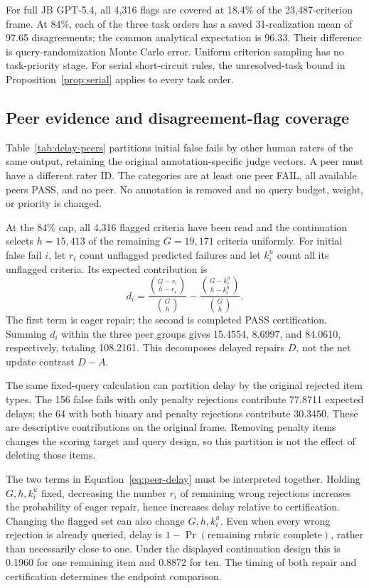 For full JB GPT-5.4, all 4,316 flags are covered at 18.4\% of the
23,487-criterion frame. At 84\%, each of the three task orders has a saved
31-realization mean of 97.65 disagreements; the common analytical expectation
is 96.33. Their difference is query-randomization Monte Carlo error.
Uniform criterion sampling has no task-priority stage. For serial
short-circuit rules, the unresolved-task bound in
Proposition~\ref{prop:serial} applies to every task order.

\subsection{Peer evidence and disagreement-flag coverage}
\label{app:flag-diagnostics}

Table~\ref{tab:delay-peers} partitions initial false fails by other human
raters of the same output, retaining the original annotation-specific
judge vectors. A peer must have a different rater ID. The categories are
at least one peer FAIL, all available peers PASS, and no peer. No annotation
is removed and no query budget, weight, or priority is changed.

At the 84\% cap, all 4,316 flagged criteria have been read and the continuation
selects $h=15{,}413$ of the remaining $G=19{,}171$ criteria uniformly. For
initial false fail $i$, let $r_i$ count unflagged predicted failures and let
$k_i^u$ count all its unflagged criteria. Its expected contribution is
\begin{equation}
 d_i=\frac{\binom{G-r_i}{h-r_i}}{\binom{G}{h}}
     -\frac{\binom{G-k_i^u}{h-k_i^u}}{\binom{G}{h}}.
 \label{eq:peer-delay}
\end{equation}
The first term is eager repair; the second is completed PASS certification.
Summing $d_i$ within the three peer groups gives 15.4554, 8.6997, and 84.0610,
respectively, totaling 108.2161. This decomposes delayed repairs $D$, not the
net update contrast $D-A$.

The same fixed-query calculation can partition delay by the original
rejected item types. The 156 false fails with only penalty rejections
contribute 77.8711 expected delays; the 64 with both binary and penalty
rejections contribute 30.3450. These are descriptive contributions on the
original frame. Removing penalty items changes the scoring target and
query design, so this partition is not the effect of deleting those items.

The two terms in Equation~\eqref{eq:peer-delay} must be interpreted together.
Holding $G,h,k_i^u$ fixed, decreasing the number $r_i$ of remaining wrong
rejections increases the probability of eager repair, hence increases
delay relative to certification. Changing the flagged set can also change
$G,h,k_i^u$. Even when every wrong rejection is already queried, delay is
$1-\Pr(\text{remaining rubric complete})$, rather than necessarily close
to one. Under the displayed continuation design this is 0.1960 for one
remaining item and 0.8872 for ten. The timing of both repair and certification
determines the endpoint comparison.

